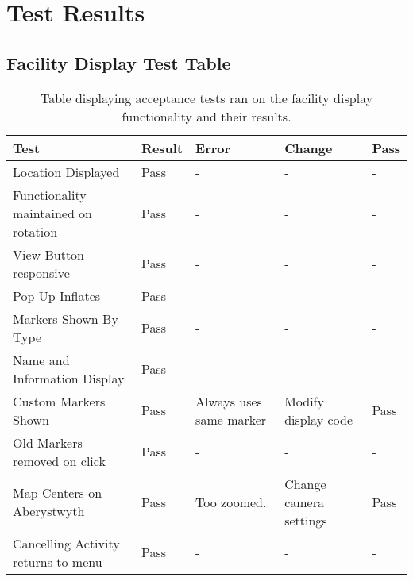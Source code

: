 \chapter{Test Results}
\section{Facility Display Test Table}
\begin{table}[h]
\begin{tabular}{|l|l|l|l|l|}
\hline
\textbf{Test}                          & \textbf{Result} & \textbf{Error}          & \textbf{Change}            & \textbf{Pass} \\ \hline
Location Displayed                     & Pass            & -                       & -                          & -             \\ \hline
Functionality maintained on rotation   & Pass            & -                       & -                          & -             \\ \hline
View Button responsive                 & Pass            & -                       & -                          & -             \\ \hline
Pop Up Inflates                        & Pass            & -                       & -                          & -             \\ \hline
Markers Shown By Type                  & Pass            & -                       & -                          & -             \\ \hline
Name and Information Display & Pass            & -                       & -                          & -             \\ \hline
Custom Markers Shown                   & Pass            & Always uses same marker & Modify display code & Pass          \\ \hline
Old Markers removed on click           & Pass            & -                       & -                          & -             \\ \hline
Map Centers on Aberystwyth             & Pass            & Too zoomed.             & Change camera settings     & Pass          \\ \hline
Cancelling Activity returns to menu    & Pass            & -                       & -                          & -              \\ \hline
\end{tabular}
\caption[Facility Display Tests]{Table displaying acceptance tests ran on the facility display functionality and their results.}
\end{table}
\newpage
